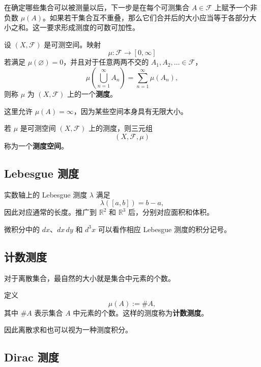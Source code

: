 \documentclass[UTF8,a4paper,11pt,openany]{ctexbook}
\begin{document}
在确定哪些集合可以被测量以后，下一步是在每个可测集合 $A\in\mathcal F$ 上赋予一个非负数 $\mu(A)$。如果若干集合互不重叠，那么它们合并后的大小应当等于各部分大小之和。这一要求形成测度的可数可加性。

\begin{definition}[测度]
设 $(X,\mathcal F)$ 是可测空间。映射
\[
\mu:\mathcal F\longrightarrow[0,\infty]
\]
若满足 $\mu(\varnothing)=0$，并且对于任意两两不交的 $A_1,A_2,\ldots\in\mathcal F$，
\begin{equation}
    \mu\left(
        \bigcup_{n=1}^{\infty}A_n
    \right)
    =
    \sum_{n=1}^{\infty}\mu(A_n),
\end{equation}
则称 $\mu$ 为 $(X,\mathcal F)$ 上的一个\textbf{测度}。
\end{definition}

这里允许 $\mu(A)=\infty$，因为某些空间本身具有无限大小。

\begin{definition}[测度空间]
若 $\mu$ 是可测空间 $(X,\mathcal F)$ 上的测度，则三元组
\[
(X,\mathcal F,\mu)
\]
称为一个\textbf{测度空间}。
\end{definition}

\subsection{Lebesgue 测度}

实数轴上的 Lebesgue 测度 $\lambda$ 满足
\[
\lambda([a,b])=b-a,
\]
因此对应通常的长度。推广到 $\mathbb R^2$ 和 $\mathbb R^3$ 后，分别对应面积和体积。

微积分中的 $dx$、$dx\,dy$ 和 $d^3x$ 可以看作相应 Lebesgue 测度的积分记号。

\subsection{计数测度}

对于离散集合，最自然的大小就是集合中元素的个数。

\begin{definition}[计数测度]
定义
\[
\mu(A):=\#A,
\]
其中 $\#A$ 表示集合 $A$ 中元素的个数。这样的测度称为\textbf{计数测度}。
\end{definition}

因此离散求和也可以视为一种测度积分。

\subsection{Dirac 测度}
\end{document}
